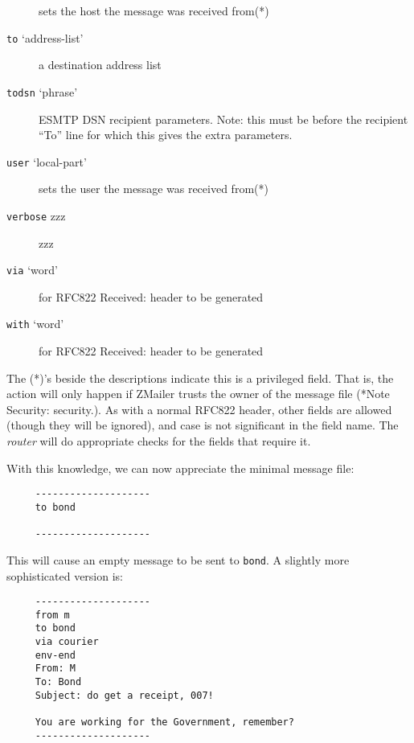 \begin{description}
sets the host the message was received from(*)

\item[{\tt to} `address-list'] \mbox{}

a destination address list

\item[{\tt todsn} `phrase'] \mbox{}

ESMTP DSN recipient parameters. Note: this must be before the recipient ``To'' line for which this gives the extra parameters.

\item[{\tt user} `local-part'] \mbox{}

sets the user the message was received from(*)

\item[{\tt verbose} zzz] \mbox{}

zzz

\item[{\tt via} `word'] \mbox{}

for RFC822 Received: header to be generated

\item[{\tt with} `word'] \mbox{}

for RFC822 Received: header to be generated

\end{description}


The (*)'s beside the descriptions indicate this is a privileged field.
That is, the action will only happen if ZMailer trusts the owner of the
message file (*Note Security: security.).  As with a normal RFC822 header,
other fields are allowed (though they will be ignored), and case is not
significant in the field name.  The {\em router\/} will do appropriate checks for
the fields that require it.

With this knowledge, we can now appreciate the minimal message file:

\begin{verbatim}
     --------------------
     to bond
     
     --------------------
\end{verbatim}


This will cause an empty message to be sent to {\tt bond}.  A slightly more
sophisticated version is:

\begin{verbatim}
     --------------------
     from m
     to bond
     via courier
     env-end
     From: M
     To: Bond
     Subject: do get a receipt, 007!
     
     You are working for the Government, remember?
     --------------------
\end{verbatim}


